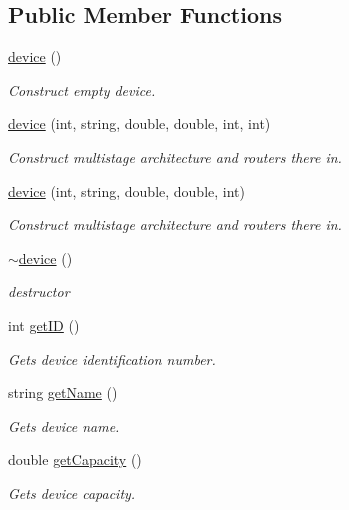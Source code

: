 \subsection*{\-Public \-Member \-Functions}
\begin{DoxyCompactItemize}
\item 
\hyperlink{classdevice_a95ab42e0b2e738637d3414347fa5559c}{device} ()
\begin{DoxyCompactList}\small\item\em \-Construct empty device. \end{DoxyCompactList}\item 
\hyperlink{classdevice_a57b9c4ac7a8bd970b81b1154ae79a5de}{device} (int, string, double, double, int, int)
\begin{DoxyCompactList}\small\item\em \-Construct multistage architecture and routers there in. \end{DoxyCompactList}\item 
\hyperlink{classdevice_a3aa4a2a68f49628354dbe33de584f726}{device} (int, string, double, double, int)
\begin{DoxyCompactList}\small\item\em \-Construct multistage architecture and routers there in. \end{DoxyCompactList}\item 
\hyperlink{classdevice_a08545ac77231c68a27c32633a9730a33}{$\sim$device} ()
\begin{DoxyCompactList}\small\item\em destructor \end{DoxyCompactList}\item 
int \hyperlink{classdevice_a5b73405bc8184085f92306d4f323b572}{get\-I\-D} ()
\begin{DoxyCompactList}\small\item\em \-Gets device identification number. \end{DoxyCompactList}\item 
string \hyperlink{classdevice_a9dc7119476febd7ba47060d74ba37e20}{get\-Name} ()
\begin{DoxyCompactList}\small\item\em \-Gets device name. \end{DoxyCompactList}\item 
double \hyperlink{classdevice_ae444f5ce9e539235bc5df36f7b47609c}{get\-Capacity} ()
\begin{DoxyCompactList}\small\item\em \-Gets device capacity. \end{DoxyCompactList}\item 

\end{DoxyCompactItemize}

